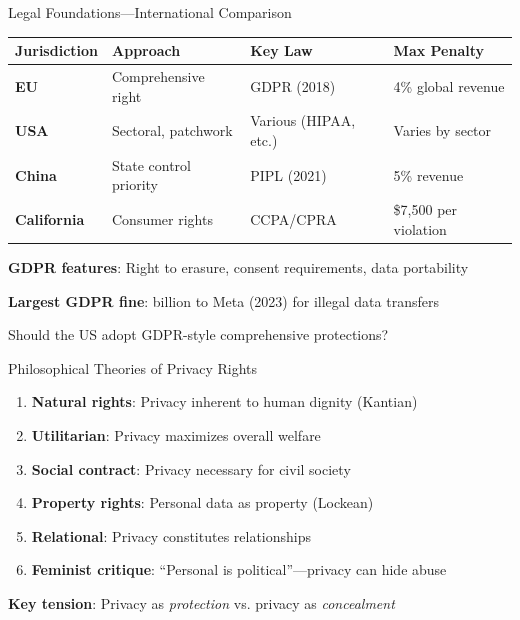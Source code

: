 ﻿\documentclass[aspectratio=169,11pt]{beamer}
\begin{document}
\begin{frame}{Legal Foundations---International Comparison}
\begin{table}[h]
\centering
\scriptsize
\begin{tabular}{@{}llll@{}}
\toprule
\textbf{Jurisdiction} & \textbf{Approach} & \textbf{Key Law} & \textbf{Max Penalty} \\
\midrule
\textbf{EU} & Comprehensive right & GDPR (2018) & 4\% global revenue \\
\textbf{USA} & Sectoral, patchwork & Various (HIPAA, etc.) & Varies by sector \\
\textbf{China} & State control priority & PIPL (2021) & 5\% revenue \\
\textbf{California} & Consumer rights & CCPA/CPRA & \$7,500 per violation \\
\bottomrule
\end{tabular}
\end{table}

\vspace{0.2em}
\textbf{GDPR features}: Right to erasure, consent requirements, data portability

\textbf{Largest GDPR fine}:  billion to Meta (2023) for illegal data transfers

\begin{discussionbox}[Discussion]
Should the US adopt GDPR-style comprehensive protections?
\end{discussionbox}
\end{frame}

\begin{frame}{Philosophical Theories of Privacy Rights}
\begin{conceptbox}
\small
\begin{enumerate}
    \item \textbf{Natural rights}: Privacy inherent to human dignity (Kantian)
    \item \textbf{Utilitarian}: Privacy maximizes overall welfare
    \item \textbf{Social contract}: Privacy necessary for civil society
    \item \textbf{Property rights}: Personal data as property (Lockean)
    \item \textbf{Relational}: Privacy constitutes relationships \parencite{rachels_privacy,nissenbaum_privacy_context}
    \item \textbf{Feminist critique}: ``Personal is political''---privacy can hide abuse
\end{enumerate}
\end{conceptbox}

\vspace{0.2em}
\textbf{Key tension}: Privacy as \emph{protection} vs. privacy as \emph{concealment}
\end{frame}
\end{document}
